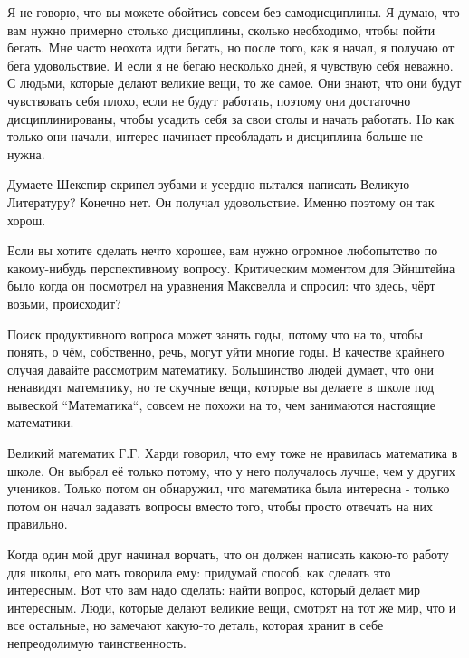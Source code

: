 \documentclass[ebook,12pt,oneside,openany]{memoir}
\begin{document}
Я не говорю, что вы можете обойтись совсем без самодисциплины. Я
думаю, что вам нужно примерно столько дисциплины, сколько необходимо,
чтобы пойти бегать. Мне часто неохота идти бегать, но после того, как
я начал, я получаю от бега удовольствие. И если я не бегаю несколько
дней, я чувствую себя неважно. С людьми, которые делают великие вещи,
то же самое. Они знают, что они будут чувствовать себя плохо, если не
будут работать, поэтому они достаточно дисциплинированы, чтобы усадить
себя за свои столы и начать работать. Но как только они начали,
интерес начинает преобладать и дисциплина больше не нужна. \newline

Думаете Шекспир скрипел зубами и усердно пытался написать Великую
Литературу? Конечно нет. Он получал удовольствие. Именно поэтому он
так хорош. \newline

Если вы хотите сделать нечто хорошее, вам нужно огромное любопытство
по какому-нибудь перспективному вопросу. Критическим моментом для
Эйнштейна было когда он посмотрел на уравнения Максвелла и спросил:
что здесь, чёрт возьми, происходит? \newline

Поиск продуктивного вопроса может занять годы, потому что на то, чтобы
понять, о чём, собственно, речь, могут уйти многие годы. В качестве
крайнего случая давайте рассмотрим математику. Большинство людей
думает, что они ненавидят математику, но те скучные вещи, которые вы
делаете в школе под вывеской ``Математика``, совсем не похожи на то, чем
занимаются настоящие математики. \newline

Великий математик Г.Г. Харди говорил, что ему тоже не нравилась
математика в школе. Он выбрал её только потому, что у него получалось
лучше, чем у других учеников. Только потом он обнаружил, что
математика была интересна - только потом он начал задавать вопросы
вместо того, чтобы просто отвечать на них правильно. \newline

Когда один мой друг начинал ворчать, что он должен написать какою-то
работу для школы, его мать говорила ему: придумай способ, как сделать
это интересным. Вот что вам надо сделать: найти вопрос, который делает
мир интересным. Люди, которые делают великие вещи, смотрят на тот же
мир, что и все остальные, но замечают какую-то деталь, которая хранит
в себе непреодолимую таинственность. \newline
\end{document}
